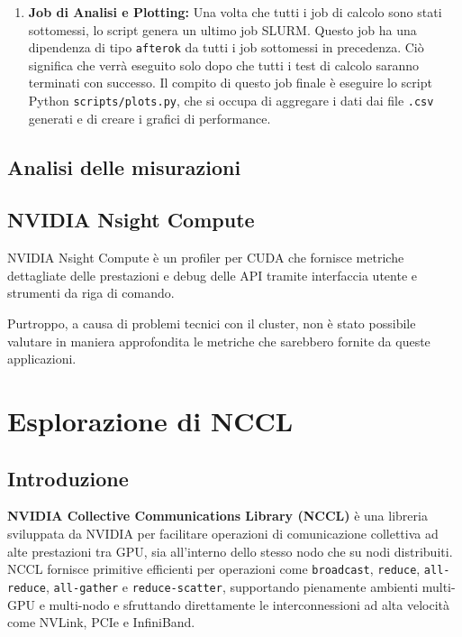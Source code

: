 \documentclass[a4paper]{article}
\begin{document}
\begin{enumerate}
    \item \textbf{Job di Analisi e Plotting:} Una volta che tutti i job di calcolo sono stati sottomessi, lo script genera un ultimo job SLURM. Questo job ha una dipendenza di tipo \texttt{afterok} da tutti i job sottomessi in precedenza. Ciò significa che verrà eseguito solo dopo che tutti i test di calcolo saranno terminati con successo. Il compito di questo job finale è eseguire lo script Python \texttt{scripts/plots.py}, che si occupa di aggregare i dati dai file \texttt{.csv} generati e di creare i grafici di performance.
\end{enumerate}

\subsection{Analisi delle misurazioni}

\subsection{NVIDIA Nsight Compute}

NVIDIA Nsight Compute è un profiler per CUDA che fornisce metriche dettagliate delle prestazioni e debug delle API tramite interfaccia utente e strumenti da riga di comando.

Purtroppo, a causa di problemi tecnici con il cluster, non è stato possibile valutare in maniera approfondita le metriche che sarebbero fornite da queste applicazioni.

\section{Esplorazione di NCCL}

\subsection{Introduzione}

\textbf{NVIDIA Collective Communications Library (NCCL)} è una libreria sviluppata da NVIDIA per facilitare operazioni di comunicazione collettiva ad alte prestazioni tra GPU, sia all'interno dello stesso nodo che su nodi distribuiti. NCCL fornisce primitive efficienti per operazioni come \texttt{broadcast}, \texttt{reduce}, \texttt{all-reduce}, \texttt{all-gather} e \texttt{reduce-scatter}, supportando pienamente ambienti multi-GPU e multi-nodo e sfruttando direttamente le interconnessioni ad alta velocità come NVLink, PCIe e InfiniBand.
\end{document}

